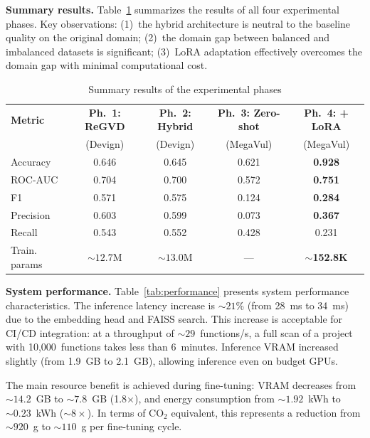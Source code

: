 \documentclass[runningheads]{llncs}
\begin{document}
\textbf{Summary results.}
Table~\ref{tab:summary} summarizes the results of all four experimental phases. Key observations: (1)~the hybrid architecture is neutral to the baseline quality on the original domain; (2)~the domain gap between balanced and imbalanced datasets is significant; (3)~LoRA adaptation effectively overcomes the domain gap with minimal computational cost.

\begin{table}
\centering
\caption{Summary results of the experimental phases}
\label{tab:summary}
\small
\begin{tabular}{|l|*{4}{c|}}
\hline
\textbf{Metric} & \textbf{Ph.~1: ReGVD} & \textbf{Ph.~2: Hybrid} & \textbf{Ph.~3: Zero-shot} & \textbf{Ph.~4: + LoRA} \\
& \footnotesize (Devign) & \footnotesize (Devign) & \footnotesize (MegaVul) & \footnotesize (MegaVul) \\
\hline
Accuracy & 0.646 & 0.645 & 0.621 & \textbf{0.928} \\
ROC-AUC & 0.704 & 0.700 & 0.572 & \textbf{0.751} \\
F1 & 0.571 & 0.575 & 0.124 & \textbf{0.284} \\
Precision & 0.603 & 0.599 & 0.073 & \textbf{0.367} \\
Recall & 0.543 & 0.552 & 0.428 & 0.231 \\
Train. params & ${\sim}12.7$M & ${\sim}13.0$M & --- & ${\sim}$\textbf{152.8K} \\
\hline
\end{tabular}
\end{table}

\textbf{System performance.}
Table~\ref{tab:performance} presents system performance characteristics. The inference latency increase is ${\sim}21$\% (from 28~ms to 34~ms) due to the embedding head and FAISS search. This increase is acceptable for CI/CD integration: at a throughput of ${\sim}29$~functions/s, a full scan of a project with 10,000~functions takes less than 6~minutes. Inference VRAM increased slightly (from 1.9~GB to 2.1~GB), allowing inference even on budget GPUs.

The main resource benefit is achieved during fine-tuning: VRAM decreases from ${\sim}14.2$~GB to ${\sim}7.8$~GB (1.8$\times$), and energy consumption from ${\sim}1.92$~kWh to ${\sim}0.23$~kWh (${\sim}8\times$). In terms of CO$_2$ equivalent, this represents a reduction from ${\sim}920$~g to ${\sim}110$~g per fine-tuning cycle.
\end{document}
